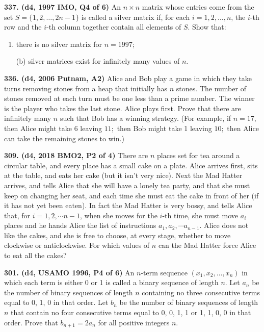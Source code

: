 \documentclass{article}
\begin{document}
        \textbf{337. (\color{red}d4\color{black}, 1997 IMO, Q4 of 6)} An $ n \times n$ matrix whose entries come from the set $ S = \{1, 2, \ldots , 2n - 1\}$ is called a silver matrix if, for each $ i = 1, 2, \ldots , n$, the $ i$-th row and the $ i$-th column together contain all elements of $ S$. Show that:

        \begin{enumerate}

                \item there is no silver matrix for $ n = 1997$;

                \item[(b)] silver matrices exist for infinitely many values of $ n$.

        \end{enumerate}

        \textbf{336. (\color{red}d4\color{black}, 2006 Putnam, A2)} Alice and Bob play a game in which they take turns removing stones from a heap that initially has \(n\) stones. The number of stones removed at each turn must be one less than a prime number. The winner is the player who takes the last stone. Alice plays first. Prove that there are infinitely many \(n\) such that Bob has a winning strategy. (For example, if \(n=17,\) then Alice might take 6 leaving \(11 ;\) then Bob might take 1 leaving \(10 ;\) then Alice can take the remaining stones to win.)

        \textbf{309. (\color{red}d4\color{black}, 2018 BMO2, P2 of 4)} There are $n$ places set for tea around a circular table, and every place has a small cake on a plate. Alice arrives first, sits at the table, and eats her cake (but it isn't very nice). Next the Mad Hatter arrives, and tells Alice that she will have a lonely tea party, and that she must keep on changing her seat, and each time she must eat the cake in front of her (if it has not yet been eaten). In fact the Mad Hatter is very bossy, and tells Alice that, for $i = 1, 2, \cdots n-1$, when she moves for the $i$-th time, she must move $a_i$ places and he hands Alice the list of instructions $a_1, a_2, \cdots a_{n-1}$. Alice does not like the cakes, and she is free to choose, at every stage, whether to move clockwise or anticlockwise. For which values of $n$ can the Mad Hatter force Alice to eat all the cakes?

        \textbf{301. (\color{red}d4\color{black}, USAMO 1996, P4 of 6)} An $n$-term sequence $(x_1, x_2, \dots, x_n)$ in which each term is either 0 or 1 is called a binary sequence of length $n$. Let $a_n$ be the number of binary sequences of length $n$ containing no three consecutive terms equal to 0, 1, 0 in that order. Let $b_n$ be the number of binary sequences of length $n$ that contain no four consecutive terms equal to 0, 0, 1, 1 or 1, 1, 0, 0 in that order. Prove that $b_{n + 1} = 2a_n$ for all positive integers $n$.
\end{document}
